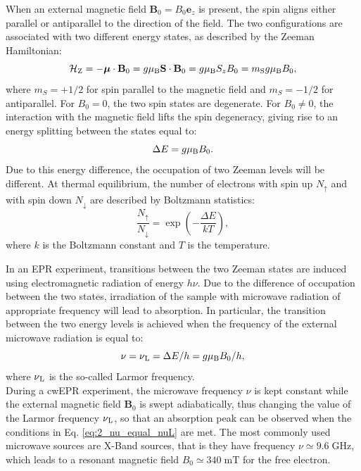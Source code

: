 \documentclass[a4paper]{book}
\newcommand{\tsub}{\textsubscript}
\newcommand{\mb}{\mathbf}
\newcommand{\mbe}{\mathbf{e}}
\begin{document}
	When an external magnetic field $\mb{B}_0 = B_0\mbe_z$ is present, the spin aligns either parallel or antiparallel to the direction of the field. The two configurations are associated with two different energy states, as described by the Zeeman Hamiltonian:
	\begin{equation}
		\mathcal{H}\tsub{Z} =
		-\boldsymbol\mu\cdot\mb{B}_0 =
		g\mu\tsub{B}\mb{S}\cdot\mb{B}_0 =
		g\mu\tsub{B}S_{z}B_0 =
		m\tsub{S}g\mu\tsub{B}B_0,
		\label{eq:2_Hz_free}
	\end{equation}
	where $m_S = +1/2$ for spin parallel to the magnetic field and $m_S = -1/2$ for antiparallel. For $B_0 = 0$, the two spin states are degenerate. For $B_0 \neq 0$, the interaction with the magnetic field lifts the spin degeneracy, giving rise to an energy splitting between the states equal to:
	\begin{equation}
		\label{eq:2_Zeeman_splitting}
		\Delta E = g\mu\tsub{B}B_0.
	\end{equation}
	Due to this energy difference, the occupation of two Zeeman levels will be different. At thermal equilibrium, the number of electrons with spin up $N_\uparrow$ and with spin down $N_\downarrow$ are described by Boltzmann statistics:
	\begin{equation}
		\frac{N_\uparrow}{N_\downarrow} =
		\exp\left(-\frac{\Delta E}{kT}\right),
	\end{equation}
	where $k$ is the Boltzmann constant and $T$ is the temperature.
	
	In an EPR experiment, transitions between the two Zeeman states are induced using electromagnetic radiation of energy $h\nu$. Due to the difference of occupation between the two states, irradiation of the sample with microwave radiation of appropriate frequency will lead to absorption. In particular, the transition between the two energy levels is achieved when the frequency of the external microwave radiation is equal to:
	\begin{equation}
		\label{eq:2_nu_equal_nuL}
		\nu = \nu \tsub L = \Delta E/h = g\mu\tsub B B_0 / h,
	\end{equation}
	where $\nu\tsub L$ is the so-called Larmor frequency.\\
	During a cwEPR experiment, the microwave frequency $\nu$ is kept constant while the external magnetic field $\mb{B}_0$ is swept adiabatically, thus changing the value of the Larmor frequency $\nu\tsub L$, so that an absorption peak can be observed when the conditions in Eq. \eqref{eq:2_nu_equal_nuL} are met. The most commonly used microwave sources are X-Band sources, that is they have frequency $\nu \simeq 9.6 \; \text{GHz}$, which leads to a resonant magnetic field $B_0 \simeq 340 \; \text{mT}$ for the free electron.
	
\end{document}
